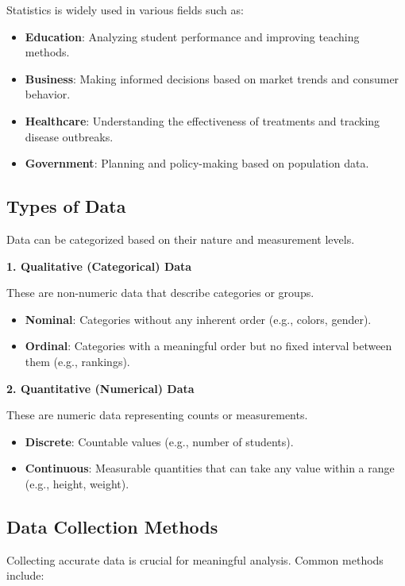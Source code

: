 \documentclass[twoside]{book}
\begin{document}
Statistics is widely used in various fields such as:

\begin{itemize}
    \item \textbf{Education}: Analyzing student performance and improving teaching methods.
    \item \textbf{Business}: Making informed decisions based on market trends and consumer behavior.
    \item \textbf{Healthcare}: Understanding the effectiveness of treatments and tracking disease outbreaks.
    \item \textbf{Government}: Planning and policy-making based on population data.
\end{itemize}

\subsection{Types of Data}

Data can be categorized based on their nature and measurement levels.

\textbf{1. Qualitative (Categorical) Data}

These are non-numeric data that describe categories or groups.

\begin{itemize}
    \item \textbf{Nominal}: Categories without any inherent order (e.g., colors, gender).
    \item \textbf{Ordinal}: Categories with a meaningful order but no fixed interval between them (e.g., rankings).
\end{itemize}

\textbf{2. Quantitative (Numerical) Data}

These are numeric data representing counts or measurements.

\begin{itemize}
    \item \textbf{Discrete}: Countable values (e.g., number of students).
    \item \textbf{Continuous}: Measurable quantities that can take any value within a range (e.g., height, weight).
\end{itemize}

\subsection{Data Collection Methods}

Collecting accurate data is crucial for meaningful analysis. Common methods include:
\end{document}
